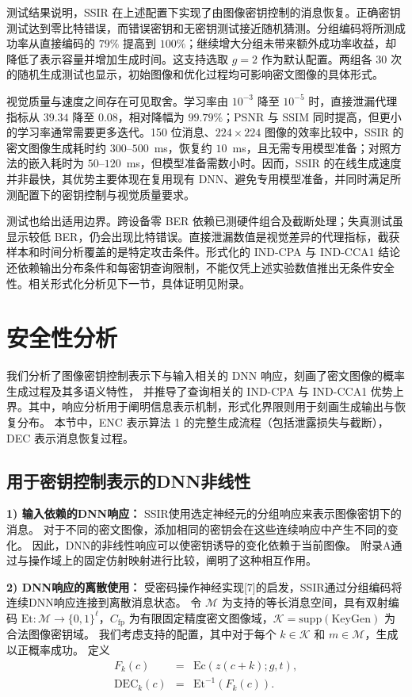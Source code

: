 \documentclass[UTF8,a4paper,zihao=-4,fontset=windows,openany]{ctexbook}
\begin{document}
测试结果说明，SSIR 在上述配置下实现了由图像密钥控制的消息恢复。正确密钥测试达到零比特错误，而错误密钥和无密钥测试接近随机猜测。分组编码将所测成功率从直接编码的 $79\%$ 提高到 $100\%$；继续增大分组未带来额外成功率收益，却降低了表示容量并增加生成时间。这支持选取 $g=2$ 作为默认配置。两组各 30 次的随机生成测试也显示，初始图像和优化过程均可影响密文图像的具体形式。

视觉质量与速度之间存在可见取舍。学习率由 $10^{-3}$ 降至 $10^{-5}$ 时，直接泄漏代理指标从 $39.34$ 降至 $0.08$，相对降幅为 $99.79\%$；PSNR 与 SSIM 同时提高，但更小的学习率通常需要更多迭代。150 位消息、$224\times224$ 图像的效率比较中，SSIR 的密文图像生成耗时约 $300$--$500$~ms，恢复约 $10$~ms，且无需专用模型准备；对照方法的嵌入耗时为 $50$--$120$~ms，但模型准备需数小时。因而，SSIR 的在线生成速度并非最快，其优势主要体现在复用现有 DNN、避免专用模型准备，并同时满足所测配置下的密钥控制与视觉质量要求。

测试也给出适用边界。跨设备零 BER 依赖已测硬件组合及截断处理；失真测试虽显示较低 BER，仍会出现比特错误。直接泄漏数值是视觉差异的代理指标，截获样本和时间分析覆盖的是特定攻击条件。形式化的 IND-CPA 与 IND-CCA1 结论还依赖输出分布条件和每密钥查询限制，不能仅凭上述实验数值推出无条件安全性。相关形式化分析见下一节，具体证明见附录。
\section{安全性分析}
我们分析了图像密钥控制表示下与输入相关的 DNN 响应，刻画了密文图像的概率生成过程及其多语义特性，
并推导了查询相关的 IND-CPA 与 IND-CCA1 优势上界。其中，响应分析用于阐明信息表示机制，形式化界限则用于刻画生成输出与恢复分布。
本节中，ENC 表示算法 1 的完整生成流程（包括泄露损失与截断），DEC 表示消息恢复过程。
\subsection{用于密钥控制表示的DNN非线性}
\textbf{1) 输入依赖的DNN响应：}
SSIR使用选定神经元的分组响应来表示图像密钥下的消息。
对于不同的密文图像，添加相同的密钥会在这些连续响应中产生不同的变化。
因此，DNN的非线性响应可以使密钥诱导的变化依赖于当前图像。
附录A通过与操作域上的固定仿射映射进行比较，阐明了这种相互作用。

\textbf{2) DNN响应的离散使用：}
受密码操作神经实现[7]的启发，SSIR通过分组编码将连续DNN响应连接到离散消息状态。
令 \(\mathcal{M}\) 为支持的等长消息空间，具有双射编码 \(\mathrm{Et} : \mathcal{M} \to \{0,1\}^\ell\)，\(C_{\mathrm{fp}}\) 为有限固定精度密文图像域，\(\mathcal{K} = \mathrm{supp}(\mathrm{KeyGen})\) 为合法图像密钥域。
我们考虑支持的配置，其中对于每个 \(k \in \mathcal{K}\) 和 \(m \in \mathcal{M}\)，生成以正概率成功。
定义
\begin{equation}
\begin{array}{rcl}
F_k(c) &=& \mathrm{Ec}(z(c+k); g, t), \\
\mathrm{DEC}_k(c) &=& \mathrm{Et}^{-1}(F_k(c)).
\end{array}
\end{equation}
\end{document}
